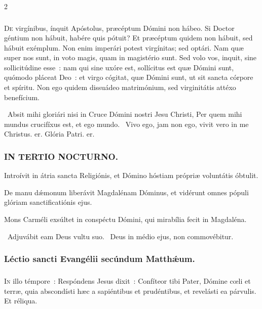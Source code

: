 \documentclass[9pt,twoside]{extarticle}
\begin{document}
\begin{multicols}{2}
{\subsubsection*{\center {}}
\lettrine{D}e virgínibus, ínquit Apóstolus, præcéptum Dómini non hábeo. Si Doctor géntium non hábuit, habére quis pótuit? Et præcéptum quidem non hábuit, sed hábuit exémplum. Non enim imperári potest virgínitas; sed optári. Nam quæ super nos sunt, in voto magis, quam in magistério sunt. Sed volo vos, inquit, sine sollicitúdine esse~: nam qui sine uxóre est, sollícitus est quæ Dómini sunt, quómodo pláceat Deo~: et virgo cógitat, quæ Dómini sunt, ut sit sancta córpore et spíritu. Non ego quidem dissuádeo matrimónium, sed virginitátis attéxo benefícium.

\begin{tightlist}{}
\item {}~Absit mihi gloriári nisi in Cruce Dómini nostri Jesu Christi, \textred{*} Per quem mihi mundus crucifíxus est, et ego mundo. ~Vivo ego, jam non ego, vivit vero in me Christus. er. Glória Patri. er.
\end{tightlist}

\subsubsection*{\center \textsc{IN TERTIO NOCTURNO.}}
\begin{tightlist}{}
\item {} Introívit in átria sancta Religiónis, et Dómino hóstiam própriæ voluntátis óbtulit.
\item {} De manu dǽmonum liberávit Magdalénam Dóminus, et vidérunt omnes pópuli glóriam sanctificatiónis ejus.
\item {} Mons Carméli exsúltet in conspéctu Dómini, qui mirabília fecit in Magdaléna.
\item {}~Adjuvábit eam Deus vultu suo. ~Deus in médio ejus, non commovébitur.
\end{tightlist}

\subsubsection*{\center Léctio sancti Evangélii secúndum Matthǽum.}
\subsubsection*{\center {}}
\lettrine{I}n illo témpore~: Respóndens Jesus dixit~: Confíteor tibi Pater, Dómine cœli et terræ, quia abscondísti hæc a sapiéntibus et prudéntibus, et revelásti ea párvulis. Et réliqua.

}
\end{multicols}
\end{document}
